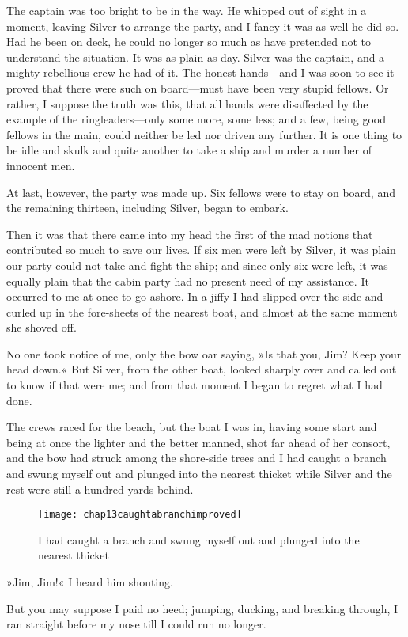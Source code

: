 The captain was too bright to be in the way. He whipped out of sight in a moment, leaving Silver to arrange the party, and I fancy it was as well he did so. Had he been on deck, he could no longer so much as have pretended not to understand the situation. It was as plain as day. Silver was the captain, and a mighty rebellious crew he had of it. The honest hands—and I was soon to see it proved that there were such on board—must have been very stupid fellows. Or rather, I suppose the truth was this, that all hands were disaffected by the example of the ringleaders—only some more, some less; and a few, being good fellows in the main, could neither be led nor driven any further. It is one thing to be idle and skulk and quite another to take a ship and murder a number of innocent men.

At last, however, the party was made up. Six fellows were to stay on board, and the remaining thirteen, including Silver, began to embark.

Then it was that there came into my head the first of the mad notions that contributed so much to save our lives. If six men were left by Silver, it was plain our party could not take and fight the ship; and since only six were left, it was equally plain that the cabin party had no present need of my assistance. It occurred to me at once to go ashore. In a jiffy I had slipped over the side and curled up in the fore-sheets of the nearest boat, and almost at the same moment she shoved off.

No one took notice of me, only the bow oar saying, »Is that you, Jim? Keep your head down.« But Silver, from the other boat, looked sharply over and called out to know if that were me; and from that moment I began to regret what I had done.

 

The crews raced for the beach, but the boat I was in, having some start and being at once the lighter and the better manned, shot far ahead of her consort, and the bow had struck among the shore-side trees and I had caught a branch and swung myself out and plunged into the nearest thicket while Silver and the rest were still a hundred yards behind.

 \begin{sidewaysfigure}
\texttt{[image: chap13caughtabranchimproved]}%
\caption[Caught a branch and swung myself out]{I had caught a branch and swung myself out and plunged into the nearest thicket}
\end{sidewaysfigure} 

»Jim, Jim!« I heard him shouting.

But you may suppose I paid no heed; jumping, ducking, and breaking through, I ran straight before my nose till I could run no longer.
\enlargethispage{\baselineskip}
